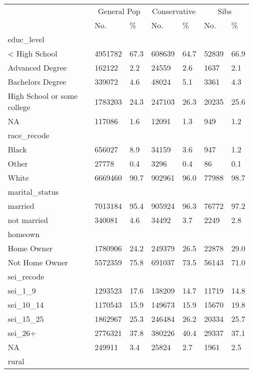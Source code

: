 \captionsetup[table]{labelformat=empty,skip=1pt}
\begin{longtable}{lllllll}
\toprule
& \multicolumn{2}{c}{General Pop} & \multicolumn{2}{c}{Conservative} & \multicolumn{2}{c}{Sibs} \\ 
 \cmidrule(lr){2-3}\cmidrule(lr){4-5}\cmidrule(lr){6-7}
 & No. & \% & No. & \% & No. & \% \\ 
\midrule
\multicolumn{1}{l}{educ\_level} \\ 
\midrule
< High School & 4951782 & 67.3 & 608639 & 64.7 & 52839 & 66.9 \\ 
Advanced Degree & 162122 & 2.2 & 24559 & 2.6 & 1637 & 2.1 \\ 
Bachelors Degree & 339072 & 4.6 & 48024 & 5.1 & 3361 & 4.3 \\ 
High School or some college & 1783203 & 24.3 & 247103 & 26.3 & 20235 & 25.6 \\ 
NA & 117086 & 1.6 & 12091 & 1.3 & 949 & 1.2 \\ 
\midrule
\multicolumn{1}{l}{race\_recode} \\ 
\midrule
Black & 656027 & 8.9 & 34159 & 3.6 & 947 & 1.2 \\ 
Other & 27778 & 0.4 & 3296 & 0.4 & 86 & 0.1 \\ 
White & 6669460 & 90.7 & 902961 & 96.0 & 77988 & 98.7 \\ 
\midrule
\multicolumn{1}{l}{marital\_status} \\ 
\midrule
married & 7013184 & 95.4 & 905924 & 96.3 & 76772 & 97.2 \\ 
not married & 340081 & 4.6 & 34492 & 3.7 & 2249 & 2.8 \\ 
\midrule
\multicolumn{1}{l}{homeown} \\ 
\midrule
Home Owner & 1780906 & 24.2 & 249379 & 26.5 & 22878 & 29.0 \\ 
Not Home Owner & 5572359 & 75.8 & 691037 & 73.5 & 56143 & 71.0 \\ 
\midrule
\multicolumn{1}{l}{sei\_recode} \\ 
\midrule
sei\_1\_9 & 1293523 & 17.6 & 138209 & 14.7 & 11719 & 14.8 \\ 
sei\_10\_14 & 1170543 & 15.9 & 149673 & 15.9 & 15670 & 19.8 \\ 
sei\_15\_25 & 1862967 & 25.3 & 246484 & 26.2 & 20334 & 25.7 \\ 
sei\_26+ & 2776321 & 37.8 & 380226 & 40.4 & 29337 & 37.1 \\ 
NA & 249911 & 3.4 & 25824 & 2.7 & 1961 & 2.5 \\ 
\midrule
\multicolumn{1}{l}{rural} \\ 

\end{longtable}
